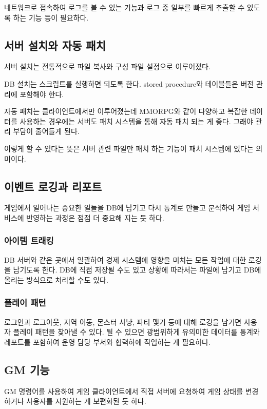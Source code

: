 \documentclass[chapter,kosection, 10.5pt, romanfixed, a4paper]{oblivoir}
\begin{document}
네트워크로 접속하여 로그를 볼 수 있는 기능과 로그 중 일부를 빠르게 추출할 수 
있도록 하는 기능 등이 필요하다. 

\subsection{서버 설치와 자동 패치}

서버 설치는 전통적으로 파일 복사와 구성 파일 설정으로 이루어졌다. 

DB 설치는 스크립트를 실행하면 되도록 한다. stored procedure와 테이블들은
버전 관리에 포함해야 한다. 

자동 패치는 클라이언트에서만 이루어졌는데 MMORPG와 같이 다양하고 복잡한 데이터를
사용하는 경우에는 서버도 패치 시스템을 통해 자동 패치 되는 게 좋다. 그래야 관리 부담이 줄어들게 된다. 

이렇게 할 수 있다는 뜻은 서버 관련 파일만 패치 하는 기능이 패치 시스템에 있다는 의미이다. 

\subsection{이벤트 로깅과 리포트}

게임에서 일어나는 중요한 일들을 DB에 남기고 다시 통계로 만들고 분석하여 
게임 서비스에 반영하는 과정은 점점 더 중요해 지는 듯 하다. 

\subsubsection{아이템 트래킹}

DB 서버와 같은 곳에서 일괄하여 경제 시스템에 영향을 미치는 모든 작업에 대한 
로깅을 남기도록 한다. DB에 직접 저장될 수도 있고 상황에 따라서는 파일에 남기고 
DB에 올리는 방식으로 처리할 수도 있다. 

\subsubsection{플레이 패턴}

로그인과 로그아웃, 지역 이동, 몬스터 사냥, 파티 맺기 등에 대해 로깅을 
남기면 사용자 플레이 패턴을 찾아낼 수 있다. 될 수 있으면 광범위하게 
유의미한 데이터를 통계와 레포트를 포함하여 운영 담당 부서와 협력하에
작업하는 게 필요하다. 

\subsection{GM 기능}

GM 명령어를 사용하여 게임 클라이언트에서 직접 서버에 요청하여 
게임 상태를 변경하거나 사용자를 지원하는 게 보편화된 듯 하다. 
\end{document}
